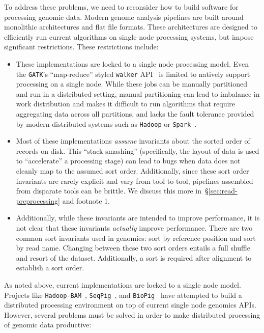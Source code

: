 \documentclass[phd]{ucbthesis}
\begin{document}
To address these problems, we need to reconsider how to build software for processing genomic data.
Modern genome analysis pipelines are built around monolithic architectures and flat file formats.
These architectures are designed to efficiently run current algorithms on single node processing
systems, but impose significant restrictions. These restrictions include:

\begin{itemize}
\item These implementations are locked to a single node processing model. Even the \texttt{GATK}'s
``map-reduce'' styled \texttt{walker} API~\cite{mckenna10} is limited to natively support processing on
a single node. While these jobs can be manually partitioned and run in a distributed setting, manual
partitioning can lead to imbalance in work distribution and makes it difficult to run algorithms that
require aggregating data across all partitions, and lacks the fault tolerance provided by modern
distributed systems such as \texttt{Hadoop} or \texttt{Spark}~\cite{zaharia12}.
\item Most of these implementations \emph{assume} invariants about the sorted order of records on
disk. This ``stack smashing'' (specifically, the layout of data is used to ``accelerate'' a processing stage)
can lead to bugs when data does not cleanly map to the assumed sort order. Additionally, since these
sort order invariants are rarely explicit and vary from tool to tool, pipelines assembled from disparate
tools can be brittle. We discuss this more in~\S\ref{sec:read-preprocessing} and footnote 1.
\item Additionally, while these invariants are intended to improve performance, it is not clear that these
invariants \emph{actually} improve performance. There are two common sort invariants used in genomics:
sort by reference position and sort by read name. Changing between these two sort orders entails
a full shuffle and resort of the dataset. Additionally, a sort is required after alignment to establish a sort order.
\end{itemize}

As noted above, current implementations are locked to a single node model. Projects like
\texttt{Hadoop-BAM}~\cite{niemenmaa12}, \texttt{SeqPig}~\cite{schumacher14}, and \texttt{BioPig}~\cite{nordberg13}
have attempted to build a distributed processing environment on top of current single node genomics APIs.
However, several problems must be solved in order to make distributed processing of genomic data productive:
\end{document}
